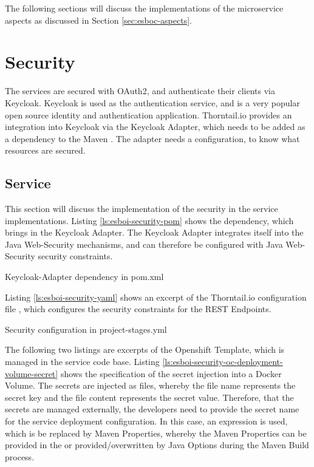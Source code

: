 The following sections will discuss the implementations of the microservice aspects as discussed in Section \vref{sec:esboc-aspects}.

\section{Security}
\label{sec:esbi-security}
The services are secured with OAuth2, and authenticate their clients via Keycloak. Keycloak is used as the authentication service, and is a very popular open source identity and authentication application. Thorntail.io provides an integration into Keycloak via the Keycloak Adapter, which needs to be added as a dependency to the Maven . The adapter needs a configuration, to know what resources are secured.

\subsection{Service}
\label{sec:esbi-security-service}
This section will discuss the implementation of the security in the service implementations. Listing \vref{ls:esboi-security-pom} shows the dependency, which brings in the Keycloak Adapter. The Keycloak Adapter integrates itself into the Java Web-Security mechanisms, and can therefore be configured with Java Web-Security security constraints.

\begin{listing}[h]
	\caption{Keycloak-Adapter dependency in pom.xml}
	\label{ls:esboi-security-pom}
\end{listing}

Listing \vref{ls:esboi-security-yaml} shows an excerpt of the Thorntail.io configuration file , which configures the security constraints for the REST Endpoints.

\begin{listing}[h]
	\caption{Security configuration in project-stages.yml}
	\label{ls:esboi-security-yaml}
\end{listing}

The following two listings are excerpts of the  Openshift Template, which is managed in the service code base. Listing \vref{ls:esboi-security-oc-deployment-volume-secret} shows the specification of the secret injection into a Docker Volume. The secrets are injected as files, whereby the file name represents the secret key and the file content represents the secret value. Therefore, that the secrets are managed externally, the developers need to provide the secret name for the service deployment configuration. In this case, an expression is used, which is be replaced by Maven Properties, whereby the Maven Properties can be provided in the  or provided/overwritten by Java Options during the Maven Build process.

